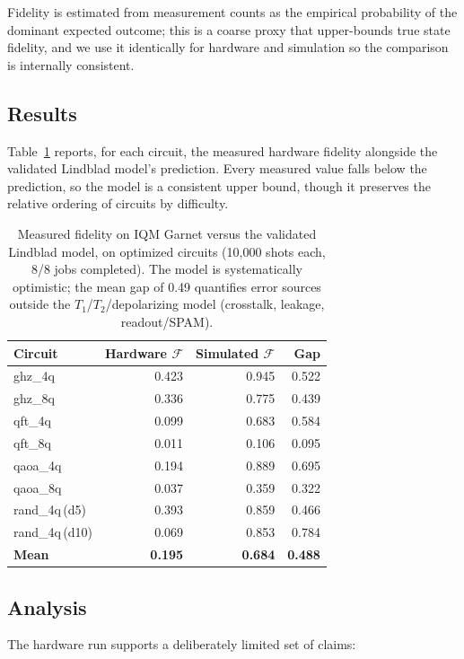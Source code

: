 \documentclass[sigconf,nonacm]{acmart}
\newcommand{\fid}{\mathcal{F}}
\begin{document}
Fidelity is estimated from measurement counts as the empirical probability of the dominant expected outcome; this is a coarse proxy that upper-bounds true state fidelity, and we use it identically for hardware and simulation so the comparison is internally consistent.

\subsection{Results}

Table~\ref{tab:hw-results} reports, for each circuit, the measured hardware fidelity alongside the validated Lindblad model's prediction. Every measured value falls below the prediction, so the model is a consistent upper bound, though it preserves the relative ordering of circuits by difficulty.

\begin{table}[t]
\centering
\caption{Measured fidelity on IQM Garnet versus the validated Lindblad model, on optimized circuits (10{,}000 shots each, 8/8 jobs completed). The model is systematically optimistic; the mean gap of 0.49 quantifies error sources outside the $T_1$/$T_2$/depolarizing model (crosstalk, leakage, readout/SPAM).}
\label{tab:hw-results}
\begin{tabular}{lrrr}
\toprule
Circuit & Hardware $\fid$ & Simulated $\fid$ & Gap \\
\midrule
ghz\_4q   & 0.423 & 0.945 & 0.522 \\
ghz\_8q   & 0.336 & 0.775 & 0.439 \\
qft\_4q   & 0.099 & 0.683 & 0.584 \\
qft\_8q   & 0.011 & 0.106 & 0.095 \\
qaoa\_4q  & 0.194 & 0.889 & 0.695 \\
qaoa\_8q  & 0.037 & 0.359 & 0.322 \\
rand\_4q\,(d5)  & 0.393 & 0.859 & 0.466 \\
rand\_4q\,(d10) & 0.069 & 0.853 & 0.784 \\
\midrule
\textbf{Mean} & \textbf{0.195} & \textbf{0.684} & \textbf{0.488} \\
\bottomrule
\end{tabular}
\end{table}

\subsection{Analysis}

The hardware run supports a deliberately limited set of claims:
\end{document}

